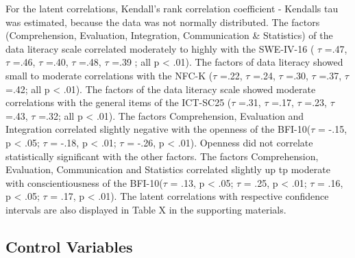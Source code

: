 \documentclass[
  12pt,
  a4paper,
  twoside]{article}
\begin{document}
For the latent correlations, Kendall's rank correlation coefficient - Kendalls tau was estimated, because the data was not normally distributed. The factors (Comprehension, Evaluation, Integration, Communication \& Statistics) of the data literacy scale correlated moderately to highly with the SWE-IV-16 ( \(\tau\) =.47, \(\tau\) =.46, \(\tau\) =.40, \(\tau\) =.48, \(\tau\) =.39 ; all p \textless{} .01). The factors of data literacy showed small to moderate correlations with the NFC-K (\(\tau\) =.22, \(\tau\) =.24, \(\tau\) =.30, \(\tau\) =.37, \(\tau\) =.42; all p \textless{} .01). The factors of the data literacy scale showed moderate correlations with the general items of the ICT-SC25 (\(\tau\) =.31, \(\tau\) =.17, \(\tau\) =.23, \(\tau\) =.43, \(\tau\) =.32; all p \textless{} .01). The factors Comprehension, Evaluation and Integration correlated slightly negative with the openness of the BFI-10(\(\tau\) = -.15, p \textless{} .05; \(\tau\) = -.18, p \textless{} .01; \(\tau\) = -.26, p \textless{} .01). Openness did not correlate statistically significant with the other factors. The factors Comprehension, Evaluation, Communication and Statistics correlated slightly up tp moderate with conscientiousness of the BFI-10(\(\tau\) = .13, p \textless{} .05; \(\tau\) = .25, p \textless{} .01; \(\tau\) = .16, p \textless{} .05; \(\tau\) = .17, p \textless{} .01). The latent correlations with respective confidence intervals are also displayed in Table X in the supporting materials.

\subsection{Control Variables}\label{control-variables}
\end{document}
